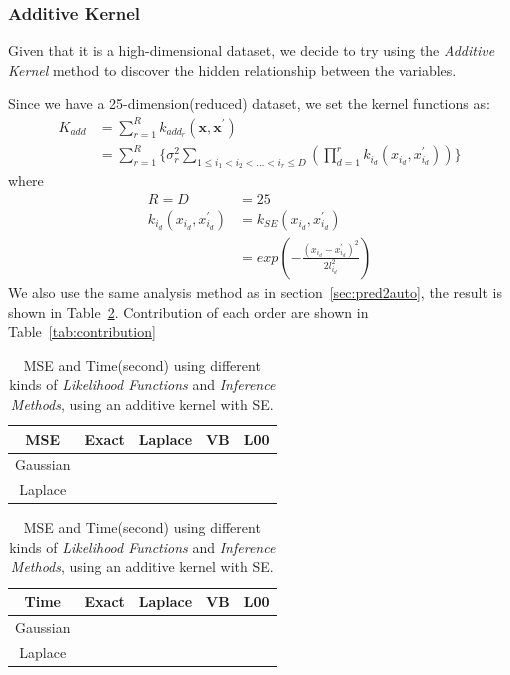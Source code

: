\subsubsection{Additive Kernel}

Given that it is a high-dimensional dataset, we decide to try using the \emph{Additive Kernel} method to discover the hidden relationship between the variables.

Since we have a 25-dimension(reduced) dataset, we set the kernel functions as:
\begin{equation}
\begin{aligned}
K_{add} &= \sum_{r=1}^{R} k_{add_{r}} (\textbf{x},\textbf{x}^{'}) \\
 &= \sum_{r=1}^{R} \{ \sigma^2_r \sum_{1 \leqslant i_1 < i_2 < ... < i_r \leqslant D} ( \prod_{d=1}^{r} k_{i_d} ({x}_{i_d},{x}_{i_d}^{'}) ) \}
\end{aligned}
\end{equation}
where 
\begin{equation}
\begin{aligned}
R = D &= 25 \\
k_{i_d} ({x}_{i_d},{x}_{i_d}^{'}) &= k_{SE} ({x}_{i_d}, {x}_{i_d}^{'}) \\
&= exp(-\frac{({x}_{i_d}-{x}_{i_d}^{'})^{2}}{2l_{i_d}^{2}})
\end{aligned}
\end{equation}
We also use the same analysis method as in section~\ref{sec:pred2auto}, the result is shown in Table~\ref{tab:predict22}.
Contribution of each order are shown in Table~\ref{tab:contribution}

\begin{table}[htp]
\centering
{\small
\begin{tabular}{|c|cccc|}
    \hline
	   MSE & Exact & Laplace & VB & L00 \\ 
    \hline
	   Gaussian & & & & \\
	   Laplace & & & & \\
    \hline
\end{tabular}

\begin{tabular}{|c|cccc|}
    \hline
	   Time & Exact & Laplace & VB & L00 \\ 
    \hline
	   Gaussian & & & & \\
	   Laplace & & & & \\
    \hline
\end{tabular}
}
\caption{MSE and Time(second) using different kinds of \emph{Likelihood Functions} and \emph{Inference Methods}, using an additive kernel with SE.}
\label{tab:predict22}
\end{table}


